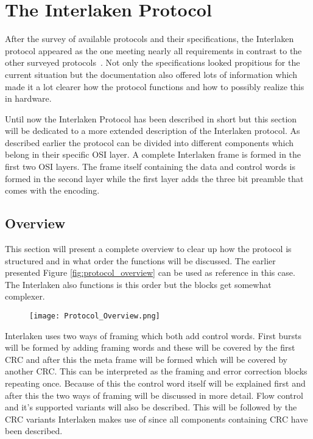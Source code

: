 \section{The Interlaken Protocol}
\label{sec:interlaken}

After the survey of available protocols and their specifications, the Interlaken protocol appeared as the one meeting nearly all requirements in contrast to the other surveyed protocols~\cite{InterlakenAlliance}. Not only the specifications looked propitious for the current situation but the documentation also offered lots of information which made it a lot clearer how the protocol functions and how to possibly realize this in hardware.

Until now the Interlaken Protocol has been described in short but this section will be dedicated to a more extended description of the Interlaken protocol.
As described earlier the protocol can be divided into different components which belong in their specific OSI layer. A complete Interlaken frame is formed in the first two OSI layers. The frame itself containing the data and control words is formed in the second layer while the first layer adds the three bit preamble that comes with the encoding.

\subsection{Overview} 
	This section will present a complete overview to clear up how the protocol is structured and in what order the functions will be discussed. The earlier presented Figure \ref{fig:protocol_overview} can be used as reference in this case. The Interlaken also functions is this order but the blocks get somewhat complexer. 

	\begin{figure}[H]
		\centering
		\texttt{[image: Protocol\_Overview.png]}	
	\end{figure} 
	
	Interlaken uses two ways of framing which both add control words. First bursts will be formed by adding framing words and these will be covered by the first CRC and after this the meta frame will be formed which will be covered by another CRC. This can be interpreted as the framing and error correction blocks repeating once. 
	Because of this the control word itself will be explained first and after this the two ways of framing will be discussed in more detail. Flow control and it's supported variants will also be described. This will be followed by the CRC variants Interlaken makes use of since all components containing CRC have been described. 
	

